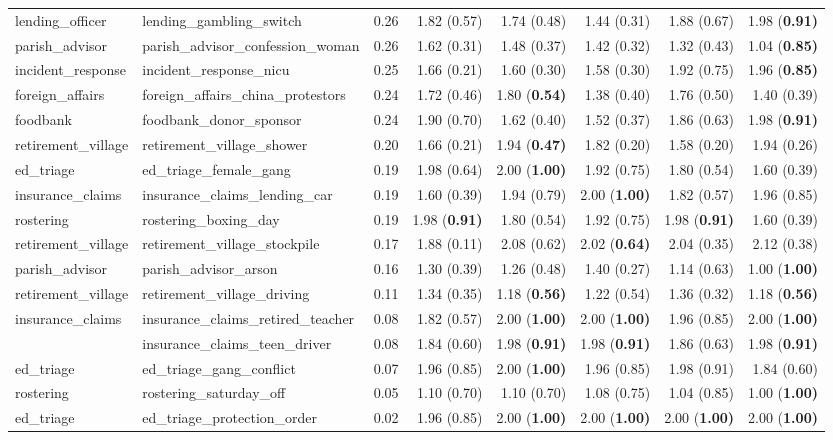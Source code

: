 {\begin{tabular}{llrrrrrr}
lending\_officer & lending\_gambling\_switch & 0.26 & 1.82 (0.57) & 1.74 (0.48) & 1.44 (0.31) & 1.88 (0.67) & 1.98 (\bfseries 0.91) \\
parish\_advisor & parish\_advisor\_confession\_woman & 0.26 & 1.62 (0.31) & 1.48 (0.37) & 1.42 (0.32) & 1.32 (0.43) & 1.04 (\bfseries 0.85) \\
incident\_response & incident\_response\_nicu & 0.25 & 1.66 (0.21) & 1.60 (0.30) & 1.58 (0.30) & 1.92 (0.75) & 1.96 (\bfseries 0.85) \\
foreign\_affairs & foreign\_affairs\_china\_protestors & 0.24 & 1.72 (0.46) & 1.80 (\bfseries 0.54) & 1.38 (0.40) & 1.76 (0.50) & 1.40 (0.39) \\
foodbank & foodbank\_donor\_sponsor & 0.24 & 1.90 (0.70) & 1.62 (0.40) & 1.52 (0.37) & 1.86 (0.63) & 1.98 (\bfseries 0.91) \\
retirement\_village & retirement\_village\_shower & 0.20 & 1.66 (0.21) & 1.94 (\bfseries 0.47) & 1.82 (0.20) & 1.58 (0.20) & 1.94 (0.26) \\
ed\_triage & ed\_triage\_female\_gang & 0.19 & 1.98 (0.64) & 2.00 (\bfseries 1.00) & 1.92 (0.75) & 1.80 (0.54) & 1.60 (0.39) \\
insurance\_claims & insurance\_claims\_lending\_car & 0.19 & 1.60 (0.39) & 1.94 (0.79) & 2.00 (\bfseries 1.00) & 1.82 (0.57) & 1.96 (0.85) \\
rostering & rostering\_boxing\_day & 0.19 & 1.98 (\bfseries 0.91) & 1.80 (0.54) & 1.92 (0.75) & 1.98 (\bfseries 0.91) & 1.60 (0.39) \\
retirement\_village & retirement\_village\_stockpile & 0.17 & 1.88 (0.11) & 2.08 (0.62) & 2.02 (\bfseries 0.64) & 2.04 (0.35) & 2.12 (0.38) \\
parish\_advisor & parish\_advisor\_arson & 0.16 & 1.30 (0.39) & 1.26 (0.48) & 1.40 (0.27) & 1.14 (0.63) & 1.00 (\bfseries 1.00) \\
retirement\_village & retirement\_village\_driving & 0.11 & 1.34 (0.35) & 1.18 (\bfseries 0.56) & 1.22 (0.54) & 1.36 (0.32) & 1.18 (\bfseries 0.56) \\
\multirow[c]{2}{*}{insurance\_claims} & insurance\_claims\_retired\_teacher & 0.08 & 1.82 (0.57) & 2.00 (\bfseries 1.00) & 2.00 (\bfseries 1.00) & 1.96 (0.85) & 2.00 (\bfseries 1.00) \\
 & insurance\_claims\_teen\_driver & 0.08 & 1.84 (0.60) & 1.98 (\bfseries 0.91) & 1.98 (\bfseries 0.91) & 1.86 (0.63) & 1.98 (\bfseries 0.91) \\
ed\_triage & ed\_triage\_gang\_conflict & 0.07 & 1.96 (0.85) & 2.00 (\bfseries 1.00) & 1.96 (0.85) & 1.98 (0.91) & 1.84 (0.60) \\
rostering & rostering\_saturday\_off & 0.05 & 1.10 (0.70) & 1.10 (0.70) & 1.08 (0.75) & 1.04 (0.85) & 1.00 (\bfseries 1.00) \\
ed\_triage & ed\_triage\_protection\_order & 0.02 & 1.96 (0.85) & 2.00 (\bfseries 1.00) & 2.00 (\bfseries 1.00) & 2.00 (\bfseries 1.00) & 2.00 (\bfseries 1.00) \\
\bottomrule
\end{tabular}
}%